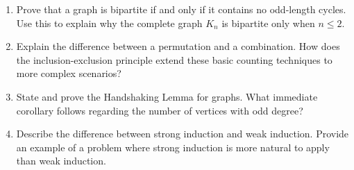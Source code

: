 \documentclass[11pt]{article}
\begin{document}
\begin{enumerate}[label=\textbf{\arabic*.}]
  \item Prove that a graph is bipartite if and only if it contains no odd-length cycles. 
  Use this to explain why the complete graph $K_n$ is bipartite only when $n \leq 2$.

  \item Explain the difference between a permutation and a combination. How does the 
  inclusion-exclusion principle extend these basic counting techniques to more complex scenarios?

  \item State and prove the Handshaking Lemma for graphs. What immediate corollary follows 
  regarding the number of vertices with odd degree?

  \item Describe the difference between strong induction and weak induction. Provide an example 
  of a problem where strong induction is more natural to apply than weak induction.

\end{enumerate}
\end{document}
